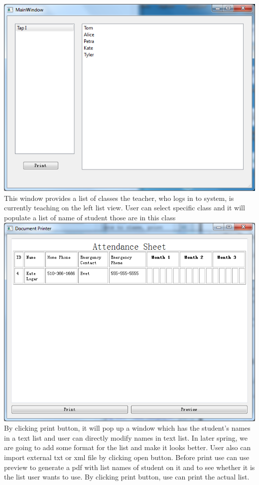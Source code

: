 \includegraphics[scale=0.5]{pics/role.png}\\
This window provides a list of classes the teacher, who logs in to system, is currently teaching on the left list view. User can select specific class and it will populate a list of name of student those are in this class\\
\includegraphics[scale=0.5]{pics/print.png}\\
By clicking print button, it will pop up a window which has the student's names in a text list and user can directly modify names in text list. In later spring, we are going to add some format for the list and make it looks better. User also can import external txt or xml file by clicking open button. Before print use can use preview to generate a pdf with list names of student on it and to see whether it is the list user wants to use. By clicking print button, use can print the actual list.

